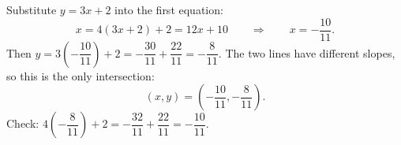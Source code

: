 Substitute $y=3x+2$ into the first equation:
\[
x=4(3x+2)+2=12x+10\qquad\Longrightarrow\qquad x=-\dfrac{10}{11}.
\]
Then $y=3\left(-\dfrac{10}{11}\right)+2=-\dfrac{30}{11}+\dfrac{22}{11}=-\dfrac{8}{11}$. The two lines have different slopes, so this is the only intersection:
\[
\boxed{(x,y)=\left(-\dfrac{10}{11},-\dfrac{8}{11}\right)}.
\]
Check: $4\left(-\dfrac{8}{11}\right)+2=-\dfrac{32}{11}+\dfrac{22}{11}=-\dfrac{10}{11}$.
